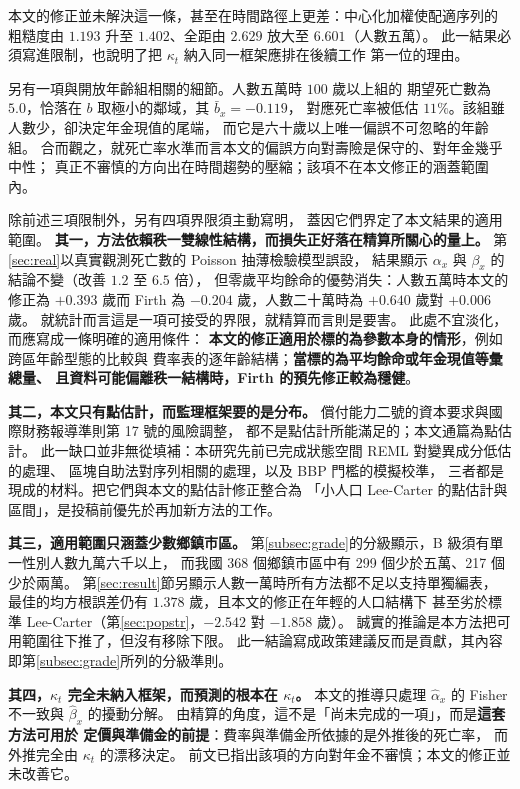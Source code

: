 \documentclass[UTF8, fontset=macnew, a4paper, 12pt]{ctexart}
\begin{document}
本文的修正並未解決這一條，甚至在時間路徑上更差：中心化加權使配適序列的
粗糙度由 $1.193$ 升至 $1.402$、全距由 $2.629$ 放大至 $6.601$（人數五萬）。
此一結果必須寫進限制，也說明了把 $\kappa_t$ 納入同一框架應排在後續工作
第一位的理由。

另有一項與開放年齡組相關的細節。人數五萬時 $100$ 歲以上組的
期望死亡數為 $5.0$，恰落在 $b$ 取極小的鄰域，其 $\bar b_x=-0.119$，
對應死亡率被低估 $11\%$。該組雖人數少，卻決定年金現值的尾端，
而它是六十歲以上唯一偏誤不可忽略的年齡組。
合而觀之，就死亡率水準而言本文的偏誤方向對壽險是保守的、對年金幾乎中性；
真正不審慎的方向出在時間趨勢的壓縮；該項不在本文修正的涵蓋範圍內。


除前述三項限制外，另有四項界限須主動寫明，
蓋因它們界定了本文結果的適用範圍。
\textbf{其一，方法依賴秩一雙線性結構，而損失正好落在精算所關心的量上。}
第\ref{sec:real}以真實觀測死亡數的 Poisson 抽薄檢驗模型誤設，
結果顯示 $\alpha_x$ 與 $\beta_x$ 的結論不變（改善 $1.2$ 至 $6.5$ 倍），
但零歲平均餘命的優勢消失：人數五萬時本文的修正為 $+0.393$ 歲而
Firth 為 $-0.204$ 歲，人數二十萬時為 $+0.640$ 歲對 $+0.006$ 歲。
就統計而言這是一項可接受的界限，就精算而言則是要害。
此處不宜淡化，而應寫成一條明確的適用條件：
\textbf{本文的修正適用於標的為參數本身的情形}，例如跨區年齡型態的比較與
費率表的逐年齡結構；\textbf{當標的為平均餘命或年金現值等彙總量、
且資料可能偏離秩一結構時，Firth 的預先修正較為穩健}。

\textbf{其二，本文只有點估計，而監理框架要的是分布。}
償付能力二號的資本要求與國際財務報導準則第 17 號的風險調整，
都不是點估計所能滿足的；本文通篇為點估計。
此一缺口並非無從填補：本研究先前已完成狀態空間 REML 對變異成分低估的處理、
區塊自助法對序列相關的處理，以及 BBP 門檻的模擬校準，
三者都是現成的材料。把它們與本文的點估計修正整合為
「小人口 Lee-Carter 的點估計與區間」，是投稿前優先於再加新方法的工作。

\textbf{其三，適用範圍只涵蓋少數鄉鎮市區。}
第\ref{subsec:grade}的分級顯示，B 級須有單一性別人數九萬六千以上，
而我國 368 個鄉鎮市區中有 299 個少於五萬、217 個少於兩萬。
第\ref{sec:result}節另顯示人數一萬時所有方法都不足以支持單獨編表，
最佳的均方根誤差仍有 $1.378$ 歲，且本文的修正在年輕的人口結構下
甚至劣於標準 Lee-Carter（第\ref{sec:popstr}，$-2.542$ 對 $-1.858$ 歲）。
誠實的推論是本方法把可用範圍往下推了，但沒有移除下限。
此一結論寫成政策建議反而是貢獻，其內容即第\ref{subsec:grade}所列的分級準則。

\textbf{其四，$\kappa_t$ 完全未納入框架，而預測的根本在 $\kappa_t$。}
本文的推導只處理 $\hat\alpha_x$ 的 Fisher 不一致與 $\hat\beta_x$ 的擾動分解。
由精算的角度，這不是「尚未完成的一項」，而是\textbf{這套方法可用於
定價與準備金的前提}：費率與準備金所依據的是外推後的死亡率，
而外推完全由 $\kappa_t$ 的漂移決定。
前文已指出該項的方向對年金不審慎；本文的修正並未改善它。
\end{document}

